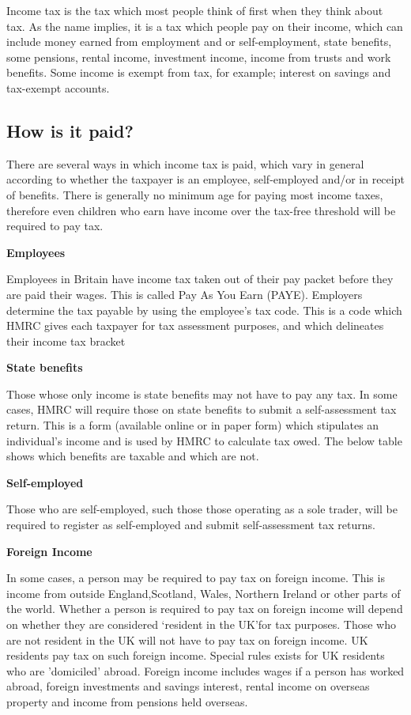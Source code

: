 \documentclass[]{tufte-handout}
\begin{document}
Income tax is the tax which most people think of first when they think
about tax. As the name implies, it is a tax which people pay on their
income, which can include money earned from employment and or
self-employment, state benefits, some pensions, rental income,
investment income, income from trusts and work benefits. Some income is
exempt from tax, for example; interest on savings and tax-exempt
accounts.

\hypertarget{how-is-it-paid}{%
\subsection{How is it paid?}\label{how-is-it-paid}}

There are several ways in which income tax is paid, which vary in
general according to whether the taxpayer is an employee, self-employed
and/or in receipt of benefits. There is generally no minimum age for
paying most income taxes, therefore even children who earn have income
over the tax-free threshold will be required to pay tax.

\textbf{Employees}

Employees in Britain have income tax taken out of their pay packet
before they are paid their wages. This is called Pay As You Earn (PAYE).
Employers determine the tax payable by using the employee's tax code.
This is a code which HMRC gives each taxpayer for tax assessment
purposes, and which delineates their income tax bracket

\textbf{State benefits}

Those whose only income is state benefits may not have to pay any tax.
In some cases, HMRC will require those on state benefits to submit a
self-assessment tax return. This is a form (available online or in paper
form) which stipulates an individual's income and is used by HMRC to
calculate tax owed. The below table shows which benefits are taxable and
which are not.

\textbf{Self-employed}

Those who are self-employed, such those those operating as a sole
trader, will be required to register as self-employed and submit
self-assessment tax returns.

\textbf{Foreign Income}

In some cases, a person may be required to pay tax on foreign income.
This is income from outside England,Scotland, Wales, Northern Ireland or
other parts of the world. Whether a person is required to pay tax on
foreign income will depend on whether they are considered `resident in
the UK'for tax purposes. Those who are not resident in the UK will not
have to pay tax on foreign income. UK residents pay tax on such foreign
income. Special rules exists for UK residents who are 'domiciled'
abroad. Foreign income includes wages if a person has worked abroad,
foreign investments and savings interest, rental income on overseas
property and income from pensions held overseas.
\end{document}
